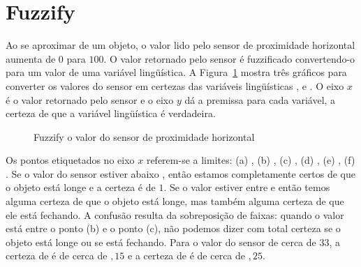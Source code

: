 \section{Fuzzify}

Ao se aproximar de um objeto, o valor lido pelo sensor de proximidade horizontal aumenta de $0$ para $100$. O valor retornado pelo sensor é fuzzificado convertendo-o para um valor de uma variável lingüística. A Figura~\ref{fig.fuzz} mostra três gráficos para converter os valores do sensor em certezas das variáveis lingüísticas ,  e . O eixo $x$ é o valor retornado pelo sensor e o eixo $y$ dá a premissa para cada variável, a certeza de que a variável lingüística é verdadeira.

\begin{figure}
\begin{center}
\caption{Fuzzify o valor do sensor de proximidade horizontal}\label{fig.fuzz}
\end{center}
\end{figure}

Os pontos etiquetados no eixo $x$ referem-se a limites: (a) , (b) , (c) , (d) , (e) , (f) . Se o valor do sensor estiver abaixo , então estamos completamente certos de que o objeto está longe e a certeza é de $1$. Se o valor estiver entre  e  então temos alguma certeza de que o objeto está longe, mas também alguma certeza de que ele está fechando. A confusão resulta da sobreposição de faixas: quando o valor está entre o ponto (b) e o ponto (c), não podemos dizer com total certeza se o objeto está longe ou se está fechando. Para o valor do sensor  de cerca de $33$, a certeza de  é de cerca de $,15$ e a certeza de  é de cerca de $,25$.

